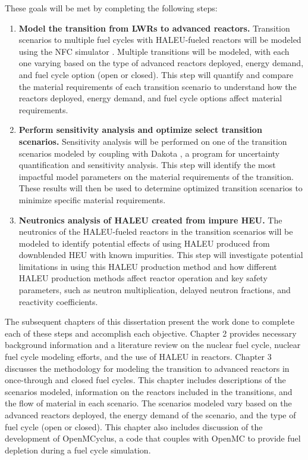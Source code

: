 These goals will be met by completing the following steps:
\vspace{0.2cm} 
\noindent
\begin{enumerate}
\item \textbf{Model the transition from \glspl{LWR} to advanced reactors.} 
Transition scenarios to multiple fuel cycles with \gls{HALEU}-fueled 
reactors will 
be modeled using the \gls{NFC} simulator \Cyclus \cite{huff_fundamental_2016}. 
Multiple transitions will be modeled, with each one varying based on the type
of advanced reactors deployed, energy demand, and fuel cycle option 
(open or closed). This 
step will quantify and compare the material requirements of each transition 
scenario to understand how the reactors deployed, energy demand, and fuel cycle
options affect material requirements. 

\item \textbf{Perform sensitivity analysis and optimize select transition scenarios.}
Sensitivity analysis will be performed on one of the transition scenarios
modeled by coupling \Cyclus with Dakota \cite{adams_dakota_2021}, a program 
for uncertainty quantification and sensitivity analysis. This step 
will identify the most impactful model parameters on 
the material requirements of the transition. These results will then be 
used to determine optimized transition scenarios to minimize specific 
material requirements. 

\item \textbf{Neutronics analysis of \gls{HALEU} created from impure \gls{HEU}.}
The neutronics of the \gls{HALEU}-fueled reactors in the transition scenarios 
will be modeled to identify potential effects of using \gls{HALEU} produced 
from downblended \gls{HEU} with known impurities. This step will investigate 
potential limitations in using this \gls{HALEU} production method and 
how different \gls{HALEU} production methods affect reactor operation and 
key safety parameters, such as neutron multiplication, delayed neutron 
fractions, and reactivity coefficients.
\end{enumerate}


The subsequent chapters of this dissertation present the work done to 
complete each of 
these steps and accomplish each objective. Chapter 2 
provides necessary 
background information and a literature review on the nuclear fuel cycle,
nuclear fuel cycle 
modeling efforts, and the use of \gls{HALEU} in reactors.
Chapter 3 discusses the methodology for modeling the transition to advanced 
reactors in once-through and closed fuel cycles. This chapter includes 
descriptions of
the scenarios modeled, information on the reactors included in the 
transitions, and the flow of 
material in each scenario. The scenarios modeled vary based on the 
advanced reactors deployed, the energy demand of the scenario, and the 
type of fuel cycle (open or closed). This chapter also includes discussion 
of the development of OpenMCyclus, a code that couples \Cyclus with OpenMC 
\cite{romano_openmc:_2015}
to provide fuel depletion during a fuel cycle simulation.


